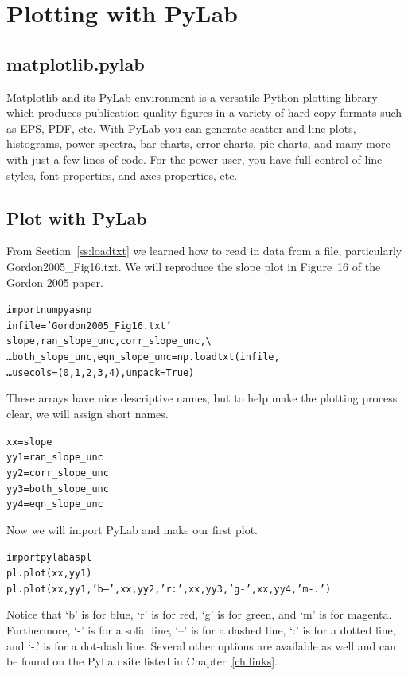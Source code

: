\chapter{Plotting with PyLab}
\label{ch:pylab}

\section{matplotlib.pylab }
Matplotlib and its PyLab environment is a versatile Python plotting
library which produces publication quality figures in a variety of
hard-copy formats such as EPS, PDF, etc.  With PyLab you can
generate scatter and line plots, histograms, power spectra, bar
charts, error-charts, pie charts, and many more with just a few lines
of code. For the power user, you have full control of line styles,
font properties, and axes properties, etc.

\section{Plot with PyLab}
From Section~\ref{ss:loadtxt} we learned how to read in data from a
file, particularly Gordon2005\_Fig16.txt.  We will reproduce the slope
plot in Figure~16 of the Gordon 2005 paper.

\begin{alltt}
\pytab import numpy as np 
\pytab infile = 'Gordon2005_Fig16.txt' 
\pytab slope, ran_slope_unc, corr_slope_unc, \textbackslash 
\ldots     both_slope_unc, eqn_slope_unc = np.loadtxt(infile, 
\ldots    usecols=(0, 1, 2, 3, 4), unpack=True) 
\end{alltt}

These arrays have nice descriptive names, but to help make the
plotting process clear, we will assign short names.

\begin{alltt}
\pytab xx = slope  
\pytab yy1 = ran_slope_unc  
\pytab yy2 = corr_slope_unc  
\pytab yy3 = both_slope_unc  
\pytab yy4 = eqn_slope_unc 
\end{alltt}

Now we will import PyLab and make our first plot.

\begin{alltt}
\pytab import pylab as pl  
\pytab pl.plot(xx,yy1)  
\pytab pl.plot(xx,yy1,'b--',xx,yy2,'r:',xx,yy3,'g-', xx,yy4,'m-.')  
\end{alltt}

Notice that `b' is for blue, `r' is for red, `g' is for green, and `m'
is for magenta.  Furthermore, `-' is for a solid line, `--' is for a
dashed line, `:' is for a dotted line, and `-.' is for a dot-dash
line.  Several other options are available as well and can be found on
the PyLab site listed in Chapter~\ref{ch:links}.

